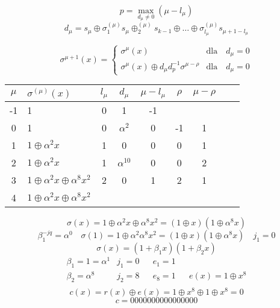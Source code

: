 \documentclass[12pt]{article}
\begin{document}
    $$p=\max_{d_{\mu}\ne 0}(\mu - l_{\mu}) $$
    $$
        d_{\mu} = s_{\mu}\oplus\sigma^{(\mu)}_1 s_{\mu}\oplus^{(\mu)}_2 s_{k-1}\oplus \dots 
        \oplus \sigma^{(\mu)}_{l_{\mu}}s_{\mu+1-l_{\mu}} 
    $$

    $$
    \sigma^{\mu+1}(x) = \begin{cases}
        \sigma^{\mu}(x)                                           & \text{dla} \quad d_{\mu} = 0  \\ 
        \sigma^{\mu}(x)\oplus d_{\mu}d^{-1}_p \sigma^{\mu - \rho} & \text{dla} \quad d_{\mu} = 0
    \end{cases}
    $$
    
    \begin{table}[h]
        \centering
        \begin{tabular}{clcccccll}
            $\mu$ & $\sigma^{(\mu)}(x)$                      & $l_{\mu}$ & $d_{\mu}$          & $\mu - l_{\mu}$ & $\rho$ & $\mu - \rho$ & \\ \hline
            -1    & 1                                        &  0        &  1                 & -1              &        &              & \\  
            0     & 1                                        &  0        &  $\alpha^2$        &  0              &   -1   &    1         & \\  
            1     & $1\oplus\alpha^2x$                       &  1        &  0                 &  0              &   0    &    1         & \\  
            2     & $1\oplus\alpha^2x$                       &  1        &  $\alpha^10$       &  0              &   0    &    2         & \\  
            3     & $1\oplus\alpha^2x \oplus \alpha^8 x^2$   &  2        &  0                 &  1              &   2    &    1         & \\  
            4     & $1\oplus\alpha^2x \oplus \alpha^8 x^2$   &           &                    &                 &        &              & \\  
        \end{tabular}
    \end{table}

    $$  \sigma(x) = 1 \oplus \alpha^2x \oplus \alpha^8x^2 = (1\oplus x)(1\oplus \alpha^8x) $$
    $$ \beta^{-jq}_1 = \alpha^0 \quad \sigma(1)=1\oplus\alpha^2\alpha^8x^2 = (1\oplus x)(1\oplus \alpha^8x) \quad j_1=0$$
    $$ \sigma(x)=(1+\beta_1x)(1+\beta_2x) $$
    \begin{align*}
        &  \beta_1=1=\alpha^1 & j_1=0 & & e_1=1 & & &\\
        & \beta_2=\alpha^8   & j_2=8  & & e_8=1 & & e(x)=1\oplus x^8 \\
    \end{align*}
    $$ c(x)=r(x)\oplus e(x) = 1\oplus x^8 \oplus 1 \oplus x^8 = 0$$
    $$ c=0000000000000000 $$ 

    
\end{document}
